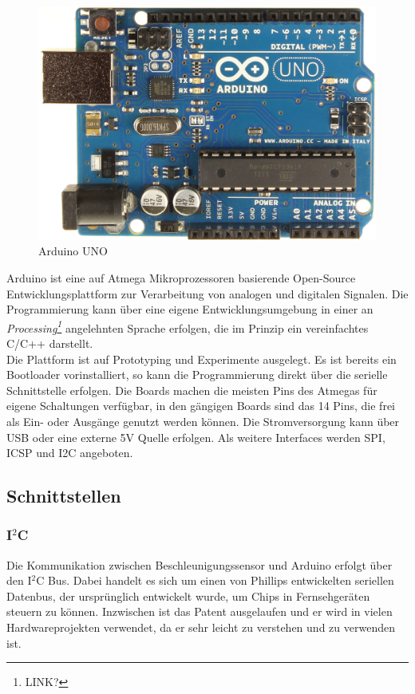 \documentclass[12pt,a4paper]{scrartcl}
\begin{document}
\begin{figure}[h]
\centering
\includegraphics[scale=.2]{hardwareimages/ArduinoUno_R3_Front.jpg}
\caption{Arduino UNO}
\label{Arduino}
\end{figure}


Arduino ist eine auf Atmega Mikroprozessoren basierende Open-Source Entwicklungsplattform zur Verarbeitung von analogen und digitalen Signalen. Die Programmierung kann über eine eigene Entwicklungsumgebung in einer an \textit{Processing\footnote{LINK?}} angelehnten Sprache erfolgen, die im Prinzip ein vereinfachtes C/C++ darstellt.\\
Die Plattform ist auf Prototyping und Experimente ausgelegt. Es ist bereits ein Bootloader vorinstalliert, so kann die Programmierung direkt über die serielle Schnittstelle erfolgen. Die Boards machen die meisten Pins des Atmegas für eigene Schaltungen verfügbar, in den gängigen Boards sind das 14 Pins, die frei als Ein- oder Ausgänge genutzt werden können.
Die Stromversorgung kann über USB oder eine externe 5V Quelle erfolgen. Als weitere Interfaces werden SPI, ICSP und I2C angeboten.

\subsection{Schnittstellen}

\subsubsection{I$^2$C}
Die Kommunikation zwischen Beschleunigungssensor und Arduino erfolgt über den  I$^2$C Bus.
Dabei handelt es sich um einen von Phillips entwickelten seriellen Datenbus, der ursprünglich entwickelt wurde, um Chips in Fernsehgeräten steuern zu können. Inzwischen ist das Patent ausgelaufen und er wird in vielen Hardwareprojekten verwendet, da er sehr leicht zu verstehen und zu verwenden ist. 
\citep{:2012fj}
\end{document}
